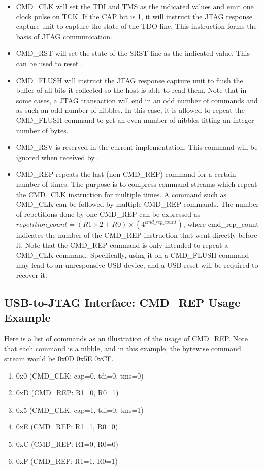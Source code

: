 \documentclass[main\_\_EN.tex]{subfiles}
\begin{document}
\begin{itemize}
\item CMD\_CLK will set the TDI and TMS as the indicated values and emit one clock pulse on TCK. If the CAP bit is 1, it will instruct the JTAG response capture unit to capture the state of the TDO line. This instruction forms the basis of JTAG communication.
\item CMD\_RST will set the state of the SRST line as the indicated value. This can be used to reset \chipname{}.
\item CMD\_FLUSH will instruct the JTAG response capture unit to flush the buffer of all bits it collected so the host is able to read them. Note that in some cases, a JTAG transaction will end in an odd number of commands and as such an odd number of nibbles. In this case, it is allowed to repeat the CMD\_FLUSH command to get an even number of nibbles fitting an integer number of bytes.
\item CMD\_RSV is reserved in the current implementation. This command will be ignored when received by \chipname{}.
\item CMD\_REP repeats the last (non-CMD\_REP) command for a certain number of times. The purpose is to compress command streams which repeat the CMD\_CLK instruction for multiple times. A command such as CMD\_CLK can be followed by multiple CMD\_REP commands. The number of repetitions done by one CMD\_REP can be expressed as \begin{math}repetition\_count = (R1 \times 2 + R0) \times (4^{cmd\_rep\_count})\end{math}, where cmd\_rep\_count indicates the number of the CMD\_REP instruction that went directly before it. Note that the CMD\_REP command is only intended to repeat a CMD\_CLK command. Specifically, using it on a CMD\_FLUSH command may lead to an unresponsive USB device, and a USB reset will be required to recover it.
\end{itemize}

\subsection{USB-to-JTAG Interface: CMD\_REP Usage Example}

Here is a list of commands as an illustration of the usage of CMD\_REP. Note that each command is a nibble, and in this example, the bytewise command stream would be 0x0D 0x5E 0xCF.

\begin{enumerate}
\item 0x0 (CMD\_CLK: cap=0, tdi=0, tms=0)
\item 0xD (CMD\_REP: R1=0, R0=1)
\item 0x5 (CMD\_CLK: cap=1, tdi=0, tms=1)
\item 0xE (CMD\_REP: R1=1, R0=0)
\item 0xC (CMD\_REP: R1=0, R0=0)
\item 0xF (CMD\_REP: R1=1, R0=1)
\end{enumerate}
\end{document}
